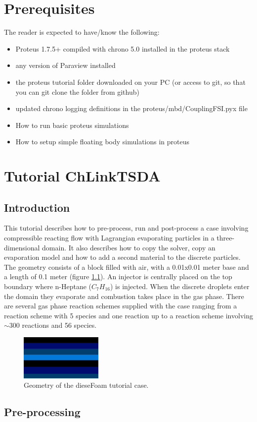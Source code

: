 \documentclass{report}
\begin{document}
\chapter*{Prerequisites}

The reader is expected to have/know the following:
\begin{itemize}
\item Proteus 1.7.5+ compiled with chrono 5.0 installed in the proteus stack
\item any version of Paraview installed
\item the proteus tutorial folder downloaded on your PC (or access to git, so that you can git clone the folder from github) 
\item updated chrono logging definitions in the proteus/mbd/CouplingFSI.pyx file
\item How to run basic proteus simulations
\item How to setup simple floating body simulations in proteus
\end{itemize}

\tableofcontents


\chapter{Tutorial ChLinkTSDA}

\section{Introduction}

This tutorial describes how to pre-process, run and post-process a case involving compressible reacting flow with Lagrangian evaporating particles in a three-dimensional domain. It also describes how to copy the solver, copy an evaporation model and how to add a second material to the discrete particles. 
\newline \newline
The geometry consists of a block filled with air, with a 0.01x0.01 meter base and a length of 0.1 meter (figure \ref{geo1}). An injector is centrally placed on the top boundary where n-Heptane ($C_7H_{16}$) is injected. When the discrete droplets enter the domain they evaporate and combustion takes place in the gas phase. There are several gas phase reaction schemes supplied with the case  ranging from a reaction scheme with 5 species and one reaction up to a reaction scheme involving $\sim$300 reactions and 56 species.    
\begin{figure}[h]
  \centering
  \includegraphics[width=4cm]{geo1.png}
  \setcaptionwidth{14cm}
  \caption{Geometry of the dieseFoam tutorial case.}
  \label{geo1}
\end{figure}
\newpage
\section{Pre-processing}
\end{document}
